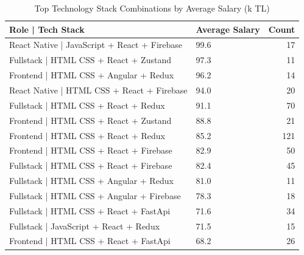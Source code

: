 \documentclass[12pt,a4paper]{article}
\begin{document}
\begin{table}[H]
	\centering
	\small
	\begin{tabular}{llr}
		\toprule
		\textbf{Role | Tech Stack}                   & \textbf{Average Salary} & \textbf{Count} \\
		\midrule
		React Native | JavaScript + React + Firebase & 99.6                    & 17             \\
		Fullstack | HTML CSS + React + Zustand       & 97.3                    & 11             \\
		Frontend | HTML CSS + Angular + Redux        & 96.2                    & 14             \\
		React Native | HTML CSS + React + Firebase   & 94.0                    & 20             \\
		Fullstack | HTML CSS + React + Redux         & 91.1                    & 70             \\
		Frontend | HTML CSS + React + Zustand        & 88.8                    & 21             \\
		Frontend | HTML CSS + React + Redux          & 85.2                    & 121            \\
		Frontend | HTML CSS + React + Firebase       & 82.9                    & 50             \\
		Fullstack | HTML CSS + React + Firebase      & 82.4                    & 45             \\
		Fullstack | HTML CSS + Angular + Redux       & 81.0                    & 11             \\
		Fullstack | HTML CSS + Angular + Firebase    & 78.3                    & 18             \\
		Fullstack | HTML CSS + React + FastApi       & 71.6                    & 34             \\
		Fullstack | JavaScript + React + Redux       & 71.5                    & 15             \\
		Frontend | HTML CSS + React + FastApi        & 68.2                    & 26             \\
		\bottomrule
	\end{tabular}
	\caption{Top Technology Stack Combinations by Average Salary (k TL)}
\end{table}
\end{document}
